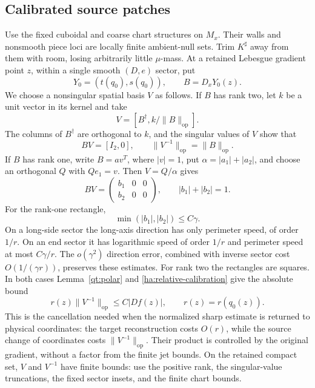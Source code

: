 \documentclass[11pt]{article}
\numberwithin{equation}{section}
\theoremstyle{definition}
\theoremstyle{remark}
\begin{document}
\subsection{Calibrated source patches}
\label{ha:patches}

Use the fixed cuboidal and coarse chart structures on $M_x$.
Their walls and nonsmooth piece loci are locally finite ambient-null
sets.  Trim $K^\sharp$ away from them with room, losing arbitrarily
little $\mu$-mass.  At a retained Lebesgue gradient point $z$, within
a single smooth $(D,e)$ sector, put
\begin{equation}\label{ha:Y0}
              Y_0=(t(q_0),s(q_0)),\qquad B=D_xY_0(z).
\end{equation}
We choose a nonsingular spatial basis $V$ as follows.  If $B$ has
rank two, let $k$ be a unit vector in its kernel and take
\[
                    V=[B^\dagger,k/\|B\|_{\mathrm{op}}].
\]
The columns of $B^\dagger$ are orthogonal to $k$, and the singular
values of $V$ show that
\begin{equation}\label{ha:rank-two-basis}
             BV=[I_2,0],\qquad
             \|V^{-1}\|_{\mathrm{op}}=\|B\|_{\mathrm{op}}.
\end{equation}
If $B$ has rank one, write $B=a v^T$, where $|v|=1$, put
$\alpha=|a_1|+|a_2|$, and choose an orthogonal $Q$ with $Qe_1=v$.
Then $V=Q/\alpha$ gives
\begin{equation}\label{ha:rank-one-basis}
 BV=\begin{pmatrix}b_1&0&0\\b_2&0&0\end{pmatrix},
 \qquad |b_1|+|b_2|=1.
\end{equation}
For the rank-one rectangle,
\begin{equation}\label{ha:b-small}
                        \min(|b_1|,|b_2|)\le C\gamma.
\end{equation}
On a long-side sector the long-axis direction has only perimeter
speed, of order $1/r$.  On an end sector it has logarithmic speed
of order $1/r$ and perimeter speed at most $C\gamma/r$.  The
$o(\gamma^2)$ direction error, combined with inverse sector cost
$O(1/(\gamma r))$, preserves these estimates.  For rank two the
rectangles are squares.  In both cases Lemma~\ref{qt:polar} and
\eqref{ha:relative-calibration} give the absolute bound
\begin{equation}\label{ha:V-cancellation}
                r(z)\|V^{-1}\|_{\mathrm{op}}\le C|Df(z)|,
                \qquad r(z)=r(q_0(z)).
\end{equation}
This is the cancellation needed when the normalized sharp estimate
is returned to physical coordinates: the target reconstruction
costs $O(r)$, while the source change of coordinates costs
$\|V^{-1}\|_{\mathrm{op}}$.  Their product is controlled by the
original gradient, without a factor from the finite jet bounds.
On the retained compact set, $V$ and $V^{-1}$ have finite bounds:
use the positive rank, the singular-value truncations, the fixed
sector insets, and the finite chart bounds.
\end{document}
